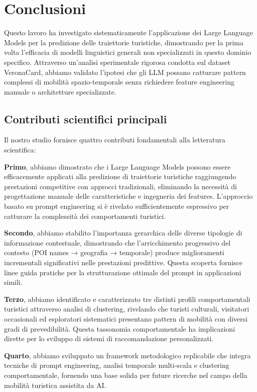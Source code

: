 \chapter{Conclusioni}

Questo lavoro ha investigato sistematicamente l'applicazione dei Large Language Models per la predizione delle traiettorie turistiche, dimostrando per la prima volta l'efficacia di modelli linguistici generali non specializzati in questo dominio specifico. Attraverso un'analisi sperimentale rigorosa condotta sul dataset VeronaCard, abbiamo validato l'ipotesi che gli LLM possano catturare pattern complessi di mobilità spazio-temporale senza richiedere feature engineering manuale o architetture specializzate.

\section{Contributi scientifici principali}

Il nostro studio fornisce quattro contributi fondamentali alla letteratura scientifica:

\textbf{Primo}, abbiamo dimostrato che i Large Language Models possono essere efficacemente applicati alla predizione di traiettorie turistiche raggiungendo prestazioni competitive con approcci tradizionali, eliminando la necessità di progettazione manuale delle caratteristiche e ingegneria dei features. L'approccio basato su prompt engineering si è rivelato sufficientemente espressivo per catturare la complessità dei comportamenti turistici.

\textbf{Secondo}, abbiamo stabilito l'importanza gerarchica delle diverse tipologie di informazione contestuale, dimostrando che l'arricchimento progressivo del contesto (POI names → geografia → temporale) produce miglioramenti incrementali significativi nelle prestazioni predittive. Questa scoperta fornisce linee guida pratiche per la strutturazione ottimale del prompt in applicazioni simili.

\textbf{Terzo}, abbiamo identificato e caratterizzato tre distinti profili comportamentali turistici attraverso analisi di clustering, rivelando che turisti culturali, visitatori occasionali ed esploratori sistematici presentano pattern di mobilità con diversi gradi di prevedibilità. Questa tassonomia comportamentale ha implicazioni dirette per lo sviluppo di sistemi di raccomandazione personalizzati.

\textbf{Quarto}, abbiamo sviluppato un framework metodologico replicabile che integra tecniche di prompt engineering, analisi temporale multi-scala e clustering comportamentale, fornendo una base solida per future ricerche nel campo della mobilità turistica assistita da AI.

